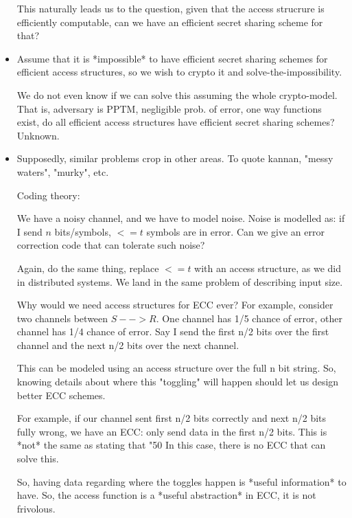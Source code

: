 \begin{itemize}
        This naturally leads us to the question, given that the access
        strucrure is efficiently computable, can we have an efficient
        secret sharing scheme for that?


    \item Assume that it is *impossible* to have efficient secret sharing
        schemes for efficient access structures, so we wish to crypto it
        and solve-the-impossibility.

        We do not even know if we can solve this assuming the whole crypto-model.
        That is, adversary is PPTM, negligible prob. of error, one way
        functions exist, do all efficient access structures have efficient
        secret sharing schemes? Unknown.

    \item Supposedly, similar problems crop in other areas. To quote kannan,
        "messy waters", "murky", etc.


        Coding theory:

        We have a noisy channel, and we have to model noise.
        Noise is modelled as: if I send $n$ bits/symbols, $<= t$ symbols
        are in error. Can we give an error correction code that can 
        tolerate such noise?

        Again, do the same thing, replace $<= t$ with an access structure, as
        we did in distributed systems.  We land in the same problem of
        describing input size.


        Why would we need access structures for ECC ever? For example, consider 
        two channels between $S --> R$. One channel has 1/5 chance of error,
        other channel has 1/4 chance of error. Say I send the first n/2 bits
        over the first channel and the next n/2 bits over the next channel.

        This can be modeled using an access structure over the full n bit
        string. So, knowing details about where this "toggling" will happen
        should let us design better ECC schemes.

        For example, if our channel sent first n/2 bits correctly and next
        n/2 bits fully wrong, we have an ECC: only send data in the first n/2
        bits. This is *not* the same as stating that "50%
        In this case, there is no ECC that can solve this.

        So, having data regarding where the toggles happen is *useful information*
        to have. So, the access function is a *useful abstraction* in ECC, it
        is not frivolous.


\end{itemize}
